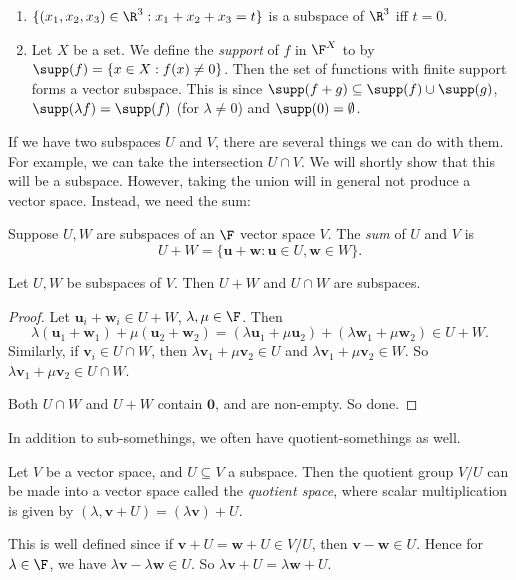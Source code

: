 \documentclass[a4paper]{article}
\begin{document}
\begin{eg}\leavevmode
  \begin{enumerate}
    \item $\{(x_1, x_2, x_3) \in \R^3: x_1 + x_2 + x_3 = t\}$ is a subspace of $\R^3$ iff $t = 0$.
    \item Let $X$ be a set. We define the \emph{support} of $f$ in $\F^X$ to by $\supp(f) = \{x\in X: f(x) \not= 0\}$. Then the set of functions with finite support forms a vector subspace. This is since $\supp (f + g) \subseteq \supp(f) \cup \supp(g)$, $\supp (\lambda f) = \supp (f)$ (for $\lambda \not= 0$) and $\supp (0) = \emptyset$.
  \end{enumerate}
\end{eg}

If we have two subspaces $U$ and $V$, there are several things we can do with them. For example, we can take the intersection $U\cap V$. We will shortly show that this will be a subspace. However, taking the union will in general not produce a vector space. Instead, we need the sum:

\begin{defi}
  Suppose $U, W$ are subspaces of an $\F$ vector space $V$. The \emph{sum} of $U$ and $V$ is
  \[
    U + W = \{\mathbf{u} + \mathbf{w}: \mathbf{u}\in U, \mathbf{w}\in W\}.
  \]
\end{defi}

\begin{prop}
  Let $U, W$ be subspaces of $V$. Then $U + W$ and $U\cap W$ are subspaces.
\end{prop}

\begin{proof}
  Let $\mathbf{u}_i + \mathbf{w}_i \in U + W$, $\lambda, \mu\in \F$. Then
  \[
    \lambda(\mathbf{u}_1 + \mathbf{w}_1) + \mu(\mathbf{u}_2 + \mathbf{w}_2) = (\lambda\mathbf{u}_1 + \mu\mathbf{u}_2) + (\lambda\mathbf{w}_1 + \mu\mathbf{w}_2) \in U + W.
  \]
  Similarly, if $\mathbf{v}_i \in U\cap W$, then $\lambda \mathbf{v}_1 + \mu \mathbf{v}_2\in U$ and $\lambda \mathbf{v}_1 + \mu \mathbf{v}_2\in W$. So $\lambda \mathbf{v}_1 + \mu \mathbf{v}_2\in U\cap W$.

  Both $U\cap W$ and $U + W$ contain $\mathbf{0}$, and are non-empty. So done.
\end{proof}

In addition to sub-somethings, we often have quotient-somethings as well.
\begin{defi}
  Let $V$ be a vector space, and $U\subseteq V$ a subspace. Then the quotient group $V/U$ can be made into a vector space called the \emph{quotient space}, where scalar multiplication is given by $(\lambda, \mathbf{v} + U) = (\lambda \mathbf{v}) + U$.

  This is well defined since if $\mathbf{v} + U = \mathbf{w} + U\in V/U$, then $\mathbf{v} - \mathbf{w} \in U$. Hence for $\lambda \in \F$, we have $\lambda \mathbf{v} - \lambda \mathbf{w} \in U$. So $\lambda \mathbf{v} + U = \lambda \mathbf{w} + U$.
\end{defi}
\end{document}
